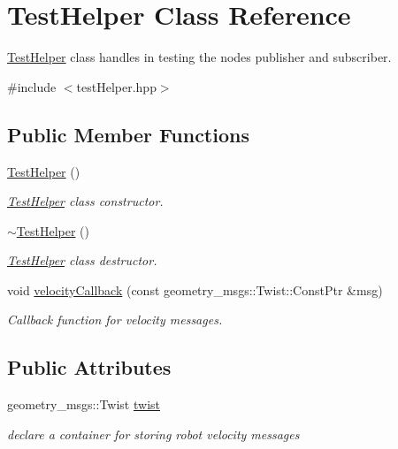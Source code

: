 \hypertarget{classTestHelper}{}\section{Test\+Helper Class Reference}
\label{classTestHelper}


\hyperlink{classTestHelper}{Test\+Helper} class handles in testing the nodes publisher and subscriber.  




{\ttfamily \#include $<$test\+Helper.\+hpp$>$}

\subsection*{Public Member Functions}
\begin{DoxyCompactItemize}
\item 
\hyperlink{classTestHelper_ae17c73ef2a5c492a3602ac49a0b11c96}{Test\+Helper} ()
\begin{DoxyCompactList}\small\item\em \hyperlink{classTestHelper}{Test\+Helper} class constructor. \end{DoxyCompactList}\item 
\hyperlink{classTestHelper_a6924609e765a4b5bba0cf322ae0568ec}{$\sim$\+Test\+Helper} ()
\begin{DoxyCompactList}\small\item\em \hyperlink{classTestHelper}{Test\+Helper} class destructor. \end{DoxyCompactList}\item 
void \hyperlink{classTestHelper_adb16c8e17de51d68a53f2ff9ead44589}{velocity\+Callback} (const geometry\+\_\+msgs\+::\+Twist\+::\+Const\+Ptr \&msg)
\begin{DoxyCompactList}\small\item\em Callback function for velocity messages. \end{DoxyCompactList}\end{DoxyCompactItemize}
\subsection*{Public Attributes}
\begin{DoxyCompactItemize}
\item 
geometry\+\_\+msgs\+::\+Twist \hyperlink{classTestHelper_a78a826fd3e1a4bc10adc910cde81668d}{twist}
\begin{DoxyCompactList}\small\item\em declare a container for storing robot velocity messages \end{DoxyCompactList}\end{DoxyCompactItemize}


